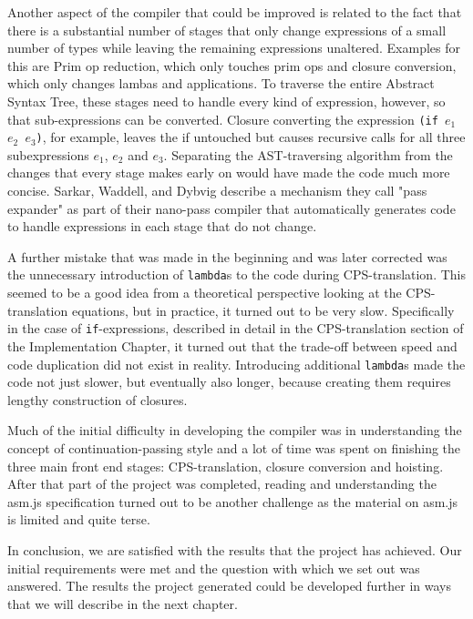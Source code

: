 \documentclass[11pt]{report}
\begin{document}
Another aspect of the compiler that could be improved is related to the fact that there is a substantial number of stages that only change expressions of a small number of types while leaving the remaining expressions unaltered. Examples for this are Prim op reduction, which only touches prim ops and closure conversion, which only changes lambas and applications. To traverse the entire Abstract Syntax Tree, these stages need to handle every kind of expression, however, so that sub-expressions can be converted. Closure converting the expression \texttt{(if $e_1$ $e_2$ $e_3$)}, for example, leaves the if untouched but causes recursive calls for all three subexpressions $e_1$, $e_2$ and $e_3$. Separating the AST-traversing algorithm from the changes that every stage makes early on would have made the code much more concise. Sarkar, Waddell, and Dybvig describe \cite{Sarkar:2004:NIC:1016848.1016878} a mechanism they call "pass expander" as part of their nano-pass compiler that automatically generates code to handle expressions in each stage that do not change.

A further mistake that was made in the beginning and was later corrected was the unnecessary introduction of \texttt{lambda}s to the code during CPS-translation. This seemed to be a good idea from a theoretical perspective looking at the CPS-translation equations, but in practice, it turned out to be very slow. Specifically in the case of \texttt{if}-expressions, described in detail in the CPS-translation section of the Implementation Chapter, it turned out that the trade-off between speed and code duplication did not exist in reality. Introducing additional \texttt{lambda}s made the code not just slower, but eventually also longer, because creating them requires lengthy construction of closures.

Much of the initial difficulty in developing the compiler was in understanding the concept of continuation-passing style and a lot of time was spent on finishing the three main front end stages: CPS-translation, closure conversion and hoisting. After that part of the project was completed, reading and understanding the asm.js specification turned out to be another challenge as the material on asm.js is limited and quite terse.

In conclusion, we are satisfied with the results that the project has achieved. Our initial requirements were met and the question with which we set out was answered. The results the project generated could be developed further in ways that we will describe in the next chapter.
\end{document}
